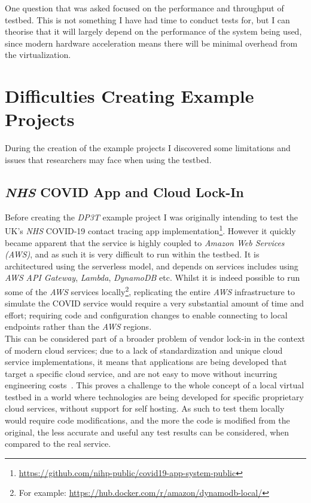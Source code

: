 \documentclass[
    author={Jacob Daniel Halsey},
    supervisor={Prof. Awais Rashid},
    degree={BSc},
    title={Building a Testbed for Evaluating Privacy Enhancing Technologies  (PETs)},
    subtitle={},
    type={software development},
    year={2021}
]{dissertation}
\begin{document}
One question that was asked focused on the performance and throughput
of testbed. This is not something I have had time to conduct tests for, but I can theorise that it will
largely depend on the performance of the system being used, since modern hardware acceleration
means there will be minimal overhead from the virtualization.

\section{Difficulties Creating Example Projects}

During the creation of the example projects I discovered some limitations and issues
that researchers may face when using the testbed.

\subsection{\emph{NHS} COVID App and Cloud Lock-In}

Before creating the \emph{DP3T} example project I was originally intending to test the UK's \emph{NHS} COVID-19 
contact tracing app implementation\footnote{\url{https://github.com/nihp-public/covid19-app-system-public}}. 
However it quickly became apparent that the service is highly coupled to
\emph{Amazon Web Services (AWS)}, and as such it is very difficult to run within the testbed.
It is architectured using the serverless model, and depends on services includes using \emph{AWS} 
\emph{API Gateway}, \emph{Lambda}, \emph{DynamoDB} etc.
Whilst it is indeed possible to run some of the \emph{AWS} services 
locally\footnote{For example: \url{https://hub.docker.com/r/amazon/dynamodb-local/}}, replicating
the entire \emph{AWS} infrastructure to simulate the COVID service would require a very substantial amount of 
time and effort; requiring code and configuration changes to enable connecting to local endpoints rather than the
\emph{AWS} regions.\\

This can be considered part of a broader problem of vendor lock-in in the context of modern
cloud services; due to a lack of standardization and unique cloud service implementations, it means
that applications are being developed that target a specific cloud service, and are not easy to move
without incurring engineering costs~\cite{cloud_lock_in}. This proves a challenge to the whole concept 
of a local virtual testbed in a world where technologies are being developed for specific proprietary
cloud services, without support for self hosting. As such to test them locally would require code modifications,
and the more the code is modified from the original, the less accurate and useful any test results can be 
considered, when compared to the real service.
\end{document}

